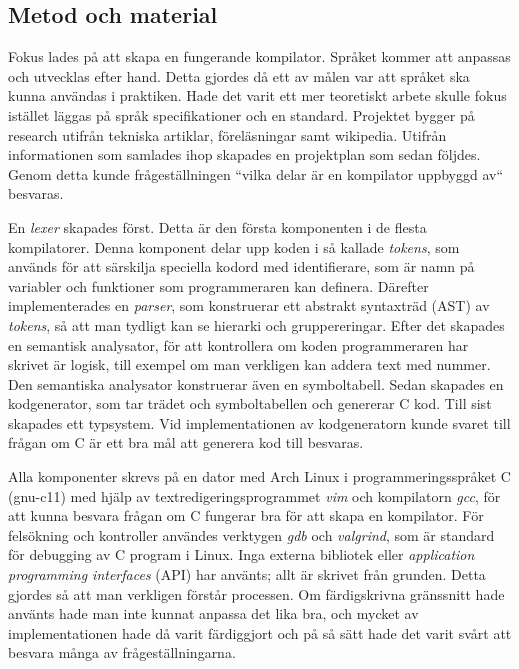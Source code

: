 \documentclass{theme}
\begin{document}
\subsection{Metod och material}

Fokus lades på att skapa en fungerande kompilator. Språket kommer att anpassas
och utvecklas efter hand. Detta gjordes då ett av målen var att språket ska
kunna användas i praktiken. Hade det varit ett mer teoretiskt arbete skulle 
fokus istället läggas på språk
specifikationer och en standard. Projektet bygger
på research utifrån tekniska artiklar, föreläsningar samt wikipedia. Utifrån
informationen som samlades ihop skapades en projektplan som sedan följdes. Genom
detta kunde frågeställningen ``vilka delar är en kompilator uppbyggd av`` besvaras.

En \textit{lexer} skapades först. Detta är den första komponenten i de
flesta kompilatorer. Denna komponent delar upp koden i så kallade \textit{tokens},
som används för att särskilja speciella kodord med identifierare, som är namn på
variabler och funktioner som programmeraren kan definera. Därefter implementerades
en \textit{parser}, som konstruerar ett abstrakt syntaxträd (AST) av \textit{tokens}, så att man tydligt
kan se hierarki och gruppereringar. Efter det skapades en semantisk analysator, för
att kontrollera om koden programmeraren har skrivet är logisk, till exempel om man
verkligen kan addera text med nummer. Den semantiska analysator konstruerar även
en symboltabell. Sedan skapades en kodgenerator, som tar trädet och symboltabellen 
och genererar C kod. Till sist skapades ett typsystem. Vid implementationen av 
kodgeneratorn kunde svaret till frågan om C är ett bra mål att generera kod till
besvaras.

Alla komponenter skrevs på en dator med Arch Linux i programmeringsspråket C 
(gnu-c11) med hjälp av textredigeringsprogrammet \textit{vim} och kompilatorn
\textit{gcc}, för att kunna besvara frågan om C fungerar bra för att skapa en
kompilator. För felsökning och kontroller användes verktygen \textit{gdb} och
\textit{valgrind}, som är standard för debugging av C program i Linux. Inga externa
bibliotek eller \textit{application programming interfaces} (API)  har använts; allt är skrivet från grunden. Detta 
gjordes så att man verkligen förstår processen. Om färdigskrivna gränssnitt hade 
använts hade man inte kunnat anpassa det lika bra, och mycket av implementationen
hade då varit färdiggjort och på så sätt hade det varit svårt att besvara många av
frågeställningarna.
\end{document}
